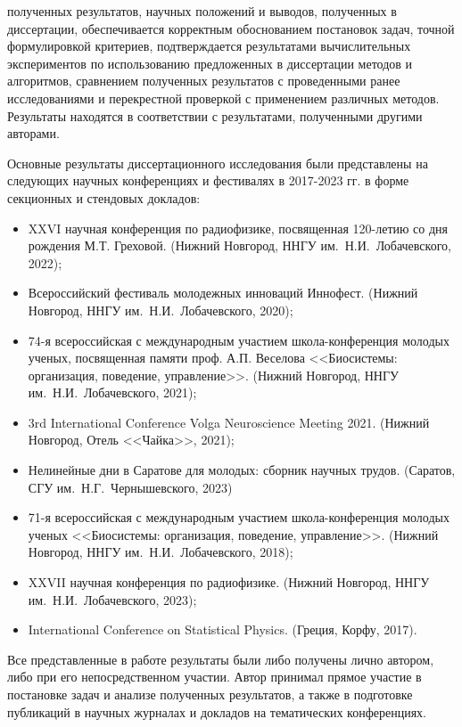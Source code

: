 {\reliability} полученных результатов, научных положений и выводов, полученных в диссертации, обеспечивается корректным обоснованием постановок задач, точной формулировкой критериев, подтверждается результатами вычислительных экспериментов по использованию предложенных в диссертации методов и алгоритмов, сравнением полученных результатов с проведенными ранее исследованиями и перекрестной проверкой с применением различных методов. Результаты находятся в соответствии с результатами, полученными другими авторами.

{\probation}
Основные результаты диссертационного исследования были представлены на следующих научных конференциях и фестивалях в 2017-2023 гг. в форме секционных и стендовых докладов:
\begin{itemize}
    \item XXVI научная конференция по радиофизике, посвященная 120-летию со дня рождения М.Т. Греховой. (Нижний Новгород, ННГУ им.~Н.И.~Лобачевского, 2022);
    \item Всероссийский фестиваль молодежных инноваций Иннофест. (Нижний Новгород, ННГУ им.~Н.И.~Лобачевского, 2020);
    \item 74-я всероссийская с международным участием школа-конференция молодых ученых, посвященная памяти проф. А.П. Веселова <<Биосистемы: организация, поведение, управление>>. (Нижний Новгород, ННГУ им.~Н.И.~Лобачевского, 2021);
    \item 3rd International Conference Volga Neuroscience Meeting 2021. (Нижний Новгород, Отель <<Чайка>>, 2021);
    \item Нелинейные дни в Саратове для молодых: сборник научных трудов. (Саратов, СГУ им.~Н.Г.~Чернышевского, 2023)
    \item 71-я всероссийская с международным участием школа-конференция молодых ученых <<Биосистемы: организация, поведение, управление>>. (Нижний Новгород, ННГУ им.~Н.И.~Лобачевского, 2018);
    \item XXVII научная конференция по радиофизике. (Нижний Новгород, ННГУ им.~Н.И.~Лобачевского, 2023);
    \item International Conference on Statistical Physics. (Греция, Корфу, 2017).
\end{itemize}


{\contribution} Все представленные в работе результаты были либо получены лично автором, либо при его непосредственном участии. Автор принимал прямое участие в постановке задач и анализе полученных результатов, а также в подготовке публикаций в научных журналах и докладов на тематических конференциях.

